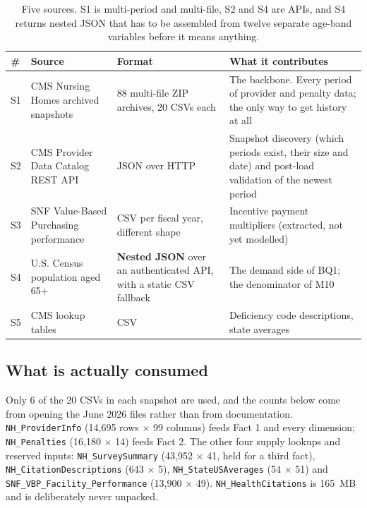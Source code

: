\documentclass[11pt,a4paper]{article}
\newcommand{\sansall}{\sffamily}
\newcommand{\code}[1]{\texttt{#1}}
\begin{document}
\begin{table}[htbp]\centering
\begin{adjustbox}{max width=\linewidth}
\small
\begin{tabular}{L{0.7cm} L{4.4cm} L{2.6cm} L{8.2cm}}
\toprule
\sansall\bfseries \# & \sansall\bfseries Source & \sansall\bfseries Format &
\sansall\bfseries What it contributes \\
\midrule
S1 & CMS Nursing Homes archived snapshots & 88 multi-file ZIP archives, 20 CSVs
     each & The backbone. Every period of provider and penalty data; the only
     way to get history at all \\
\addlinespace
S2 & CMS Provider Data Catalog REST API & JSON over HTTP &
     Snapshot discovery (which periods exist, their size and date) and
     post-load validation of the newest period \\
\addlinespace
S3 & SNF Value-Based Purchasing performance & CSV per fiscal year, different
     shape & Incentive payment multipliers (extracted, not yet modelled) \\
\addlinespace
S4 & U.S. Census population aged 65+ & \textbf{Nested JSON} over an
     authenticated API, with a static CSV fallback & The demand side of BQ1;
     the denominator of M10 \\
\addlinespace
S5 & CMS lookup tables & CSV & Deficiency code descriptions, state averages \\
\bottomrule
\end{tabular}
\end{adjustbox}
\caption{Five sources. S1 is multi-period and multi-file, S2 and S4 are APIs,
and S4 returns nested JSON that has to be assembled from twelve separate age-band
variables before it means anything.}
\end{table}

\subsection{What is actually consumed}

Only 6 of the 20 CSVs in each snapshot are used, and the counts below come from
opening the June 2026 files rather than from documentation.
\code{NH\_ProviderInfo} (14{,}695 rows $\times$ 99 columns) feeds Fact 1 and
every dimension; \code{NH\_Penalties} (16{,}180 $\times$ 14) feeds Fact 2. The
other four supply lookups and reserved inputs:
\code{NH\_SurveySummary} (43{,}952 $\times$ 41, held for a third fact),
\code{NH\_CitationDescriptions} (643 $\times$ 5),
\code{NH\_StateUSAverages} (54 $\times$ 51) and
\code{SNF\_VBP\_Facility\_Performance} (13{,}900 $\times$ 49).
\code{NH\_HealthCitations} is 165~MB and is deliberately never unpacked.
\end{document}

